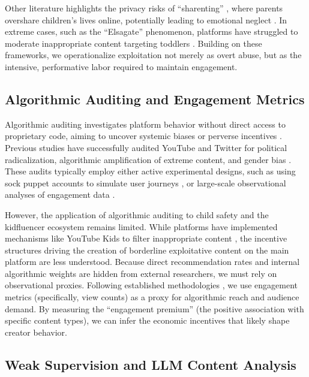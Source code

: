\documentclass[]{ieeeaccess}
\begin{document}
Other literature highlights the privacy risks of ``sharenting'' \cite{steinberg2017sharenting,kopecky2020sharenting}, where parents overshare children's lives online, potentially leading to emotional neglect \cite{keskin2023sharenting}. In extreme cases, such as the ``Elsagate'' phenomenon, platforms have struggled to moderate inappropriate content targeting toddlers \cite{papadamou2020disturbed,bridle2017something,tahir2019bringing}. Building on these frameworks, we operationalize exploitation not merely as overt abuse, but as the intensive, performative labor required to maintain engagement.

\subsection{Algorithmic Auditing and Engagement Metrics}

Algorithmic auditing investigates platform behavior without direct access to proprietary code, aiming to uncover systemic biases or perverse incentives \cite{sandvig2014auditing,metaxa2021auditing}. Previous studies have successfully audited YouTube and Twitter for political radicalization, algorithmic amplification of extreme content, and gender bias \cite{ribeiro2020auditing,huszar2022algorithmic,haroon2023auditing,hussein2020measuring}. These audits typically employ either active experimental designs, such as using sock puppet accounts to simulate user journeys \cite{habib2025auditing}, or large-scale observational analyses of engagement data \cite{bouchaud2024auditing}. 

However, the application of algorithmic auditing to child safety and the kidfluencer ecosystem remains limited. While platforms have implemented mechanisms like YouTube Kids to filter inappropriate content \cite{papadamou2020disturbed}, the incentive structures driving the creation of borderline exploitative content on the main platform are less understood. Because direct recommendation rates and internal algorithmic weights are hidden from external researchers, we must rely on observational proxies. Following established methodologies \cite{covington2016deep,zhou2010impact,rieder2018ranking}, we use engagement metrics (specifically, view counts) as a proxy for algorithmic reach and audience demand. By measuring the ``engagement premium'' (the positive association with specific content types), we can infer the economic incentives that likely shape creator behavior.

\subsection{Weak Supervision and LLM Content Analysis}
\end{document}
